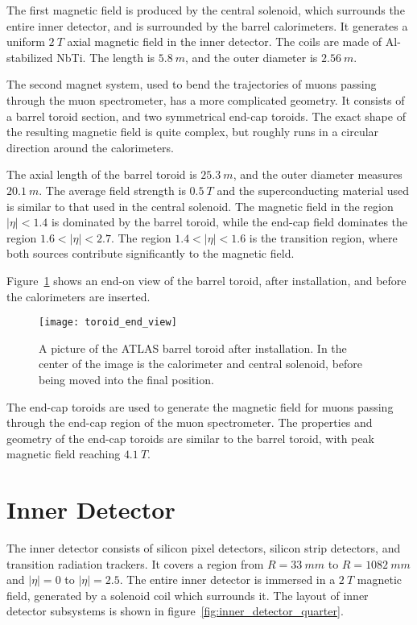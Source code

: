 The first magnetic field is produced by the central solenoid, which surrounds the entire inner detector,
and is surrounded by the barrel calorimeters.
It generates a uniform $2~T$ axial magnetic field in the inner detector.
The coils are made of Al-stabilized NbTi. The length is $5.8~m$, and the outer diameter is $2.56~m$\cite{atlas-detector-2008}.

The second magnet system, used to bend the trajectories of muons passing through the muon spectrometer,
has a more complicated geometry.
It consists of a barrel toroid section, and two symmetrical end-cap toroids.
The exact shape of the resulting magnetic field is quite complex,
but roughly runs in a circular direction around the calorimeters.

The axial length of the barrel toroid is $25.3~m$, and the outer diameter measures $20.1~m$.
The average field strength is $0.5~T$ and the superconducting material used is similar to that used in the
central solenoid\cite{atlas-detector-2008}.
The magnetic field in the region $|\eta|<1.4$ is dominated by the barrel toroid,
while the end-cap field dominates the region $1.6 < |\eta| < 2.7$.
The region $1.4 < |\eta| < 1.6$ is the transition region, where both sources contribute significantly to the magnetic field.

Figure~\ref{fig:toroid_end_view} shows an end-on view of the barrel toroid, after installation,
and before the calorimeters are inserted.

\begin{figure}[!ht]\centering
\texttt{[image: toroid\_end\_view]}
\caption{A picture of the ATLAS barrel toroid after installation. In
  the center of the image is the calorimeter and central solenoid,
  before being moved into the final position.}
\label{fig:toroid_end_view}
\end{figure}

The end-cap toroids are used to generate the magnetic field for muons passing through the end-cap region of the muon spectrometer.
The properties and geometry of the end-cap toroids are similar to the barrel toroid,
with peak magnetic field reaching $4.1~T$\cite{atlas-detector-2008}.

\section{Inner Detector}\label{sec:inner_detector}
The inner detector consists of silicon pixel detectors, silicon strip detectors, and transition radiation trackers.
It covers a region from $R = 33~mm$ to $R = 1082~mm$ and $|\eta| = 0$ to $|\eta| = 2.5$.
The entire inner detector is immersed in a $2~T$ magnetic field, generated by a
solenoid coil which surrounds it.\cite{atlas-detector-2008}
The layout of inner detector subsystems is shown in figure~\ref{fig:inner_detector_quarter}.

